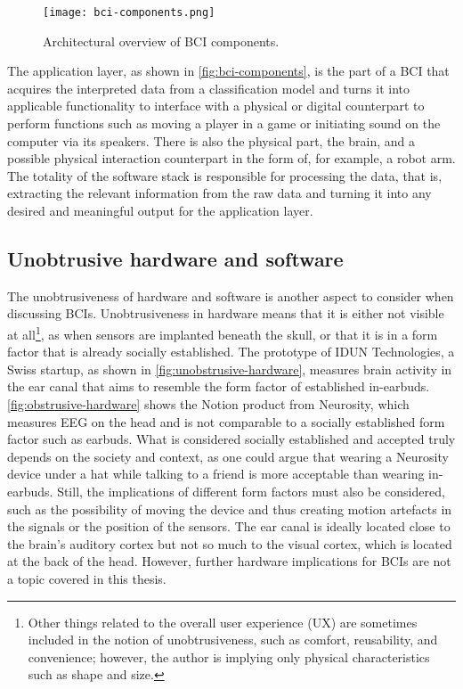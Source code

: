 \begin{figure}[!ht]
  \centering
  \texttt{[image: bci-components.png]}
  \caption{Architectural overview of BCI components.}
  \label{fig:bci-components}
\end{figure}

The application layer, as shown in \autoref{fig:bci-components}, is the part of a BCI that acquires the interpreted data from a classification model and turns it into applicable functionality to interface with a physical or digital counterpart to perform functions such as moving a player in a game or initiating sound on the computer via its speakers. There is also the physical part, the brain, and a possible physical interaction counterpart in the form of, for example, a robot arm. The totality of the software stack is responsible for processing the data, that is, extracting the relevant information from the raw data and turning it into any desired and meaningful output for the application layer.

\subsection{Unobtrusive hardware and software}
\label{chapter2-unobtrusive-hardware-and-software}

The unobtrusiveness of hardware and software is another aspect to consider when discussing BCIs. Unobtrusiveness in hardware means that it is either not visible at all\footnote{Other things related to the overall user experience (UX) are sometimes included in the notion of unobtrusiveness, such as comfort, reusability, and convenience; however, the author is implying only physical characteristics such as shape and size.}, as when sensors are implanted beneath the skull, or that it is in a form factor that is already socially established. The prototype of IDUN Technologies, a Swiss startup, as shown in \autoref{fig:unobstrusive-hardware}, measures brain activity in the ear canal that aims to resemble the form factor of established in-earbuds. \autoref{fig:obstrusive-hardware} shows the Notion product from Neurosity, which measures EEG on the head and is not comparable to a socially established form factor such as earbuds. What is considered socially established and accepted truly depends on the society and context, as one could argue that wearing a Neurosity device under a hat while talking to a friend is more acceptable than wearing in-earbuds. Still, the implications of different form factors must also be considered, such as the possibility of moving the device and thus creating motion artefacts in the signals or the position of the sensors. The ear canal is ideally located close to the brain’s auditory cortex but not so much to the visual cortex, which is located at the back of the head. However, further hardware implications for BCIs are not a topic covered in this thesis.

